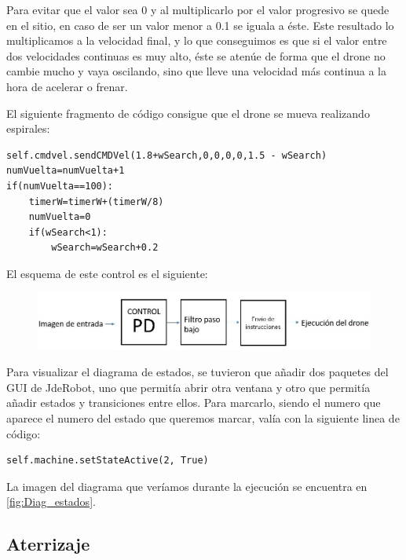 \hspace{1cm}Para evitar que el valor sea 0 y al multiplicarlo por el valor progresivo se quede en el sitio, en caso de ser un valor menor a 0.1 se iguala a \'este. Este resultado lo multiplicamos a la velocidad final, y lo que conseguimos es que si el valor entre dos velocidades continuas es muy alto, \'este se aten\'ue de forma que el drone no cambie mucho y vaya oscilando, sino que lleve una velocidad m\'as continua a la hora de acelerar o frenar.  

El siguiente fragmento de c\'odigo consigue que el drone se mueva realizando espirales:

\begin{lstlisting}[backgroundcolor=\color{yellow}]
self.cmdvel.sendCMDVel(1.8+wSearch,0,0,0,0,1.5 - wSearch)
numVuelta=numVuelta+1
if(numVuelta==100):
    timerW=timerW+(timerW/8)
    numVuelta=0
    if(wSearch<1):
        wSearch=wSearch+0.2
\end{lstlisting}

\hspace{1 cm} El esquema de este control es el siguiente:
\begin{figure}[ht]
	\centering
		\includegraphics[width=1\textwidth]{imgs/esquemapd2.png}
	\label{fig:Esquema_control}
\end{figure}


\hspace{1cm} Para visualizar el diagrama de estados, se tuvieron que añadir dos paquetes del GUI de JdeRobot, uno que permit\'ia abrir otra ventana y otro que permit\'ia añadir estados y transiciones entre ellos. Para marcarlo, siendo el numero que aparece el numero del estado que queremos marcar, val\'ia con la siguiente linea de c\'odigo:

\begin{lstlisting}[backgroundcolor=\color{yellow}]
self.machine.setStateActive(2, True)
\end{lstlisting}
	
\hspace{1cm}La imagen del diagrama que ver\'iamos durante la ejecuci\'on se encuentra en \ref{fig:Diag_estados}.

\subsection{Aterrizaje}

